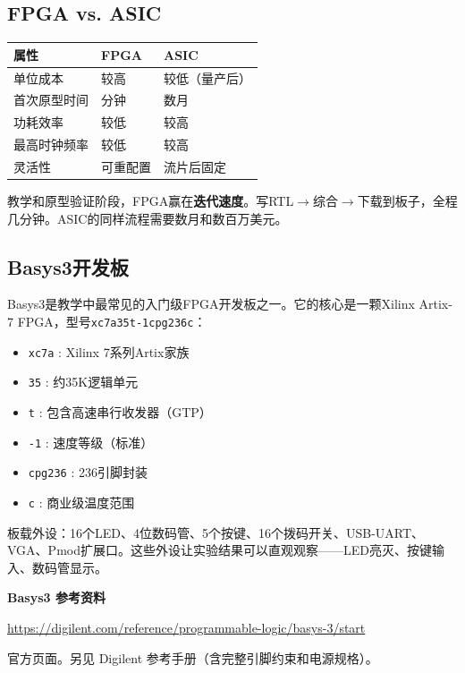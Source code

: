 \documentclass[11pt,a4paper]{article}
\begin{document}
\subsection{FPGA vs. ASIC}

\begin{center}
\begin{tabular}{lll}
\toprule
\textbf{属性} & \textbf{FPGA} & \textbf{ASIC} \\
\midrule
单位成本 & 较高 & 较低（量产后） \\
首次原型时间 & 分钟 & 数月 \\
功耗效率 & 较低 & 较高 \\
最高时钟频率 & 较低 & 较高 \\
灵活性 & 可重配置 & 流片后固定 \\
\bottomrule
\end{tabular}
\end{center}

教学和原型验证阶段，FPGA赢在\textbf{迭代速度}。写RTL$\rightarrow$综合$\rightarrow$下载到板子，全程几分钟。ASIC的同样流程需要数月和数百万美元。

\subsection{Basys3开发板}

Basys3是教学中最常见的入门级FPGA开发板之一。它的核心是一颗Xilinx Artix-7 FPGA，型号\texttt{xc7a35t-1cpg236c}：
\begin{itemize}
  \item \texttt{xc7a} : Xilinx 7系列Artix家族
  \item \texttt{35} : 约35K逻辑单元
  \item \texttt{t} : 包含高速串行收发器（GTP）
  \item \texttt{-1} : 速度等级（标准）
  \item \texttt{cpg236} : 236引脚封装
  \item \texttt{c} : 商业级温度范围
\end{itemize}

板载外设：16个LED、4位数码管、5个按键、16个拨码开关、USB-UART、VGA、Pmod扩展口。这些外设让实验结果可以直观观察——LED亮灭、按键输入、数码管显示。

\begin{tipbox}
\textbf{Basys3 参考资料}

\url{https://digilent.com/reference/programmable-logic/basys-3/start}

官方页面。另见 Digilent 参考手册（含完整引脚约束和电源规格）。
\end{tipbox}
\end{document}
